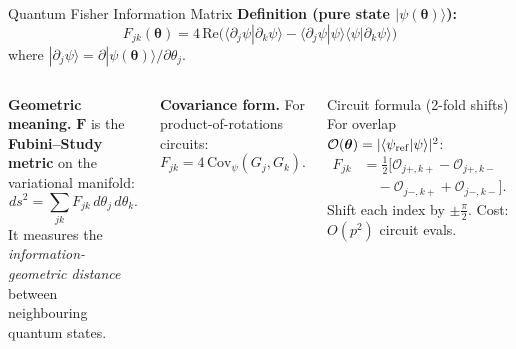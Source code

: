 \documentclass[aspectratio=169,11pt]{beamer}
\newcommand{\btheta}{\boldsymbol{\theta}}
\newcommand{\QFI}{\mathbf{F}}
\begin{document}
\begin{frame}{Quantum Fisher Information Matrix}
\small
  \textbf{Definition (pure state $|\psi(\btheta)\rangle$):}
  \[
    F_{jk}(\btheta)
    = 4\,\mathrm{Re}\!\bigl(
        \langle\partial_j\psi|\partial_k\psi\rangle
       -\langle\partial_j\psi|\psi\rangle
        \langle\psi|\partial_k\psi\rangle
      \bigr)
  \]
  where $|\partial_j\psi\rangle=\partial|\psi(\btheta)\rangle/\partial\theta_j$.

  \smallskip
  \begin{columns}[T]
    \small\textbf{Geometric meaning.}  $\QFI$ is the
    \textbf{Fubini--Study metric} on the variational manifold:
    \[
      ds^2 = \sum_{jk}F_{jk}\,d\theta_j\,d\theta_k.
    \]
    It measures the \emph{information-geometric distance}
    between neighbouring quantum states.

    \textbf{Covariance form.} For product-of-rotations circuits:
    \[
      F_{jk} = 4\,\mathrm{Cov}_\psi(G_j, G_k).
    \]
    \begin{block}{Circuit formula (2-fold shifts)}
      For overlap $\mathcal{O}(\btheta)=|\langle\psi_{\rm ref}|\psi\rangle|^2$:
      \begin{align*}
        F_{jk} &= \tfrac{1}{2}[\mathcal{O}_{j+,k+}
         -\mathcal{O}_{j+,k-}\\
         &\quad-\mathcal{O}_{j-,k+}
         +\mathcal{O}_{j-,k-}].
      \end{align*}
      Shift each index by $\pm\tfrac\pi2$.
      Cost: $O(p^2)$ circuit evals.
    \end{block}
  \end{columns}
\end{frame}
\end{document}
